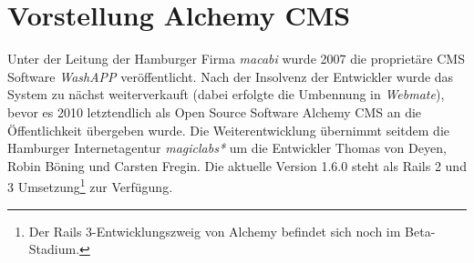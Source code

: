\section{Vorstellung Alchemy CMS}
Unter der Leitung der Hamburger Firma \emph{macabi} wurde 2007 die proprietäre CMS Software \emph{WashAPP} veröffentlicht. Nach der Insolvenz der Entwickler wurde das System zu nächst weiterverkauft (dabei erfolgte die Umbennung in \emph{Webmate}), bevor es 2010 letztendlich als Open Source Software Alchemy CMS an die Öffentlichkeit übergeben wurde. Die Weiterentwicklung übernimmt seitdem die Hamburger Internetagentur \emph{magiclabs*} um die Entwickler Thomas von Deyen, Robin Böning und Carsten Fregin. Die aktuelle Version 1.6.0 steht als Rails 2 und 3 Umsetzung\footnote{Der Rails 3-Entwicklungszweig von Alchemy befindet sich noch im Beta-Stadium.} zur Verfügung.
